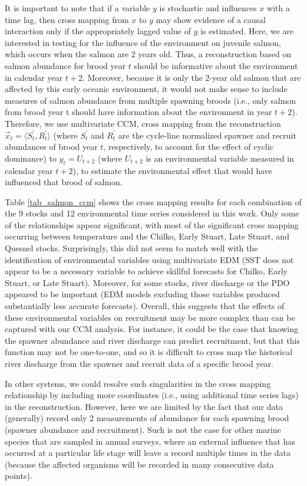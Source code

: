 It is important to note that if a variable $y$ is stochastic and influences $x$ with a time lag, then cross mapping from $x$ to $y$ may show evidence of a causal interaction only if the appropriately lagged value of $y$ is estimated. Here, we are interested in testing for the influence of the environment on juvenile salmon, which occurs when the salmon are 2 years old. Thus, a reconstruction based on salmon abundance for brood year $t$ should be informative about the environment in calendar year $t+2$. Moreover, because it is only the 2-year old salmon that are affected by this early oceanic environment, it would not make sense to include measures of salmon abundance from multiple spawning broods (i.e., only salmon from brood year t should have information about the environment in year $t+2$). Therefore, we use multivariate CCM, cross mapping from the reconstruction $\vec{x}_t = \langle S_t^\prime, R_t^\prime \rangle$ (where $S_t^\prime$ and $R_t^\prime$ are the cycle-line normalized spawner and recruit abundances of brood year $t$, respectively, to account for the effect of cyclic dominance) to $y_t = U_{t+2}$ (where $U_{t+2}$ is an environmental variable measured in calendar year $t+2$), to estimate the environmental effect that would have influenced that brood of salmon.

Table \ref{tab_salmon_ccm} shows the cross mapping results for each combination of the 9 stocks and 12 environmental time series considered in this work. Only some of the relationships appear significant, with most of the significant cross mapping occurring between temperature and the Chilko, Early Stuart, Late Stuart, and Quesnel stocks. Surprisingly, this did not seem to match well with the identification of environmental variables using multivariate EDM (SST does not appear to be a necessary variable to achieve skillful forecasts for Chilko, Early Stuart, or Late Stuart). Moreover, for some stocks, river discharge or the PDO appeared to be important (EDM models excluding those variables produced substantially less accurate forecasts). Overall, this suggests that the effects of these environmental variables on recruitment may be more complex than can be captured with our CCM analysis. For instance, it could be the case that knowing the spawner abundance and river discharge can predict recruitment, but that this function may not be one-to-one, and so it is difficult to cross map the historical river discharge from the spawner and recruit data of a specific brood year.

In other systems, we could resolve such singularities in the cross mapping relationship by including more coordinates (i.e., using additional time series lags) in the reconstruction. However, here we are limited by the fact that our data (generally) record only 2 measurements of abundance for each spawning brood (spawner abundance and recruitment). Such is not the case for other marine species that are sampled in annual surveys, where an external influence that has occurred at a particular life stage will leave a record multiple times in the data (because the affected organisms will be recorded in many consecutive data points).

